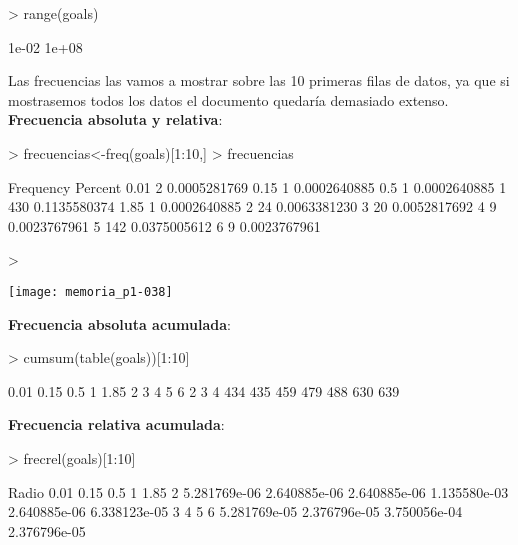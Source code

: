 \documentclass [a4paper] {article}
\begin{document}
\begin{Schunk}
\begin{Sinput}
> range(goals)
\end{Sinput}
\begin{Soutput}
[1] 1e-02 1e+08
\end{Soutput}
\end{Schunk}
Las frecuencias las vamos a mostrar sobre las 10 primeras filas de datos, ya que si mostrasemos
todos los datos el documento quedaría demasiado extenso.\\
\textbf{Frecuencia absoluta y relativa}:
\begin{center}

\begin{Schunk}
\begin{Sinput}
> frecuencias<-freq(goals)[1:10,]
> frecuencias
\end{Sinput}
\begin{Soutput}
     Frequency      Percent
0.01         2 0.0005281769
0.15         1 0.0002640885
0.5          1 0.0002640885
1          430 0.1135580374
1.85         1 0.0002640885
2           24 0.0063381230
3           20 0.0052817692
4            9 0.0023767961
5          142 0.0375005612
6            9 0.0023767961
\end{Soutput}
\begin{Sinput}
> 
\end{Sinput}
\end{Schunk}
\texttt{[image: memoria\_p1-038]}
\end{center}
\textbf{Frecuencia absoluta acumulada}:

\begin{Schunk}
\begin{Sinput}
> cumsum(table(goals))[1:10]
\end{Sinput}
\begin{Soutput}
0.01 0.15  0.5    1 1.85    2    3    4    5    6 
   2    3    4  434  435  459  479  488  630  639 
\end{Soutput}
\end{Schunk}
\textbf{Frecuencia relativa acumulada}:

\begin{Schunk}
\begin{Sinput}
> frecrel(goals)[1:10]
\end{Sinput}
\begin{Soutput}
Radio
        0.01         0.15          0.5            1         1.85            2 
5.281769e-06 2.640885e-06 2.640885e-06 1.135580e-03 2.640885e-06 6.338123e-05 
           3            4            5            6 
5.281769e-05 2.376796e-05 3.750056e-04 2.376796e-05 
\end{Soutput}
\end{Schunk}
\end{document}
